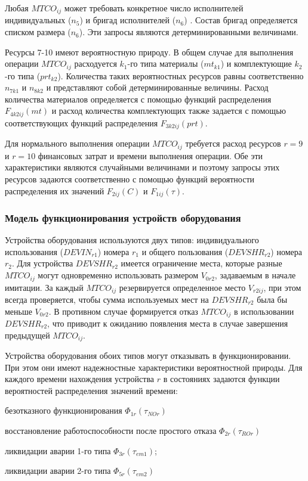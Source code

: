 Любая $MTCO_{ij}$ может требовать конкретное число исполнителей индивидуальных ($n_5$)  и бригад исполнителей ($n_6$) . Состав бригад определяется списком размера ($n_6$). Эти запросы являются детерминированными величинами.

Ресурсы 7-10 имеют вероятностную природу. В общем случае для выполнения операции  $MTCO_{ij}$ расходуется $k_1$-го типа материалы ($mt_{k1}$) и комплектующие $k_2$-го типа ($prt_{k2}$). Количества таких вероятностных ресурсов равны соответственно $n_{7k1}$ и $n_{8k2}$ и представляют собой детерминированные величины.
Расход количества материалов определяется с помощью функций распределения $F_{4k2ij}(mt)$ и расход количества комплектующих также задается с помощью соответствующих функций распределения $F_{3k2ij}(prt)$.

Для нормального выполнения операции $MTCO_{ij}$ требуется расход ресурсов $r=9$ и $r=10$ финансовых затрат и времени выполнения операции. Обе эти характеристики являются случайными величинами  и поэтому запросы этих ресурсов задаются соответственно с помощью функций вероятности распределения их значений $F_{2ij}(C)$  и $F_{1ij}( \tau )$.


\subsubsection{Модель функционирования устройств оборудования}
\label{sec_chapter_enterprise_op_model}


Устройства оборудования используются двух типов: индивидуального использования ($DEVIN_{r1}$) номера $r_1$  и общего пользования ($DEVSHR_{r2}$)  номера  $r_2$.  Для устройства $DEVSHR_{r2}$ имеется ограничение места, которые разные  $MTCO_{ij}$ могут одновременно использовать размером $V_{0r2}$, задаваемым в начале имитации. За каждый $MTCO_{ij}$ резервируется определенное место $V_{r2ij}$, при этом всегда проверяется, чтобы сумма используемых мест  на $DEVSHR_{r2}$ была бы меньше $V_{0r2}$. В противном случае формируется отказ $MTCO_{ij}$ в использовании $DEVSHR_{r2}$, что приводит к ожиданию появления места в случае завершения предыдущей $MTCO_{ij}$.

Устройства оборудования обоих типов могут отказывать в функционировании. При этом они имеют надежностные характеристики вероятностной природы. Для каждого времени нахождения устройства $r$  в состояниях задаются функции вероятностей распределения значений времени:
\begin{textitemize}
    \item безотказного функционирования $\Phi_{1r}(\tau_{NOr})$
    \item восстановление работоспособности после простого отказа $\Phi_{2r}(\tau_{ROr})$
    \item ликвидации аварии 1-го типа $\Phi_{3r}(\tau_{em1})$;
    \item ликвидации аварии 2-го типа $\Phi_{5r}(\tau_{em2})$

\end{textitemize}

